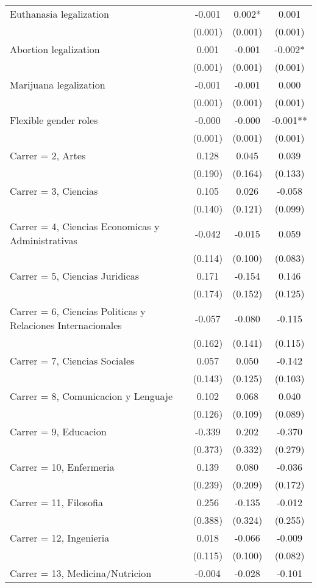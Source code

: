 \documentclass[]{article}
\begin{document}
\begin{tabular}{lccc}
Euthanasia legalization & -0.001 & 0.002* & 0.001 \\
 & (0.001) & (0.001) & (0.001) \\
Abortion legalization & 0.001 & -0.001 & -0.002* \\
 & (0.001) & (0.001) & (0.001) \\
Marijuana legalization & -0.001 & -0.001 & 0.000 \\
 & (0.001) & (0.001) & (0.001) \\
Flexible gender roles & -0.000 & -0.000 & -0.001** \\
 & (0.001) & (0.001) & (0.001) \\
Carrer = 2, Artes & 0.128 & 0.045 & 0.039 \\
 & (0.190) & (0.164) & (0.133) \\
Carrer = 3, Ciencias & 0.105 & 0.026 & -0.058 \\
 & (0.140) & (0.121) & (0.099) \\
Carrer = 4, Ciencias Economicas y Administrativas & -0.042 & -0.015 & 0.059 \\
 & (0.114) & (0.100) & (0.083) \\
Carrer = 5, Ciencias Juridicas & 0.171 & -0.154 & 0.146 \\
 & (0.174) & (0.152) & (0.125) \\
Carrer = 6, Ciencias Politicas y Relaciones Internacionales & -0.057 & -0.080 & -0.115 \\
 & (0.162) & (0.141) & (0.115) \\
Carrer = 7, Ciencias Sociales & 0.057 & 0.050 & -0.142 \\
 & (0.143) & (0.125) & (0.103) \\
Carrer = 8, Comunicacion y Lenguaje & 0.102 & 0.068 & 0.040 \\
 & (0.126) & (0.109) & (0.089) \\
Carrer = 9, Educacion & -0.339 & 0.202 & -0.370 \\
 & (0.373) & (0.332) & (0.279) \\
Carrer = 10, Enfermeria & 0.139 & 0.080 & -0.036 \\
 & (0.239) & (0.209) & (0.172) \\
Carrer = 11, Filosofia & 0.256 & -0.135 & -0.012 \\
 & (0.388) & (0.324) & (0.255) \\
Carrer = 12, Ingenieria & 0.018 & -0.066 & -0.009 \\
 & (0.115) & (0.100) & (0.082) \\
Carrer = 13, Medicina/Nutricion & -0.004 & -0.028 & -0.101 \\

\end{tabular}
\end{document}
